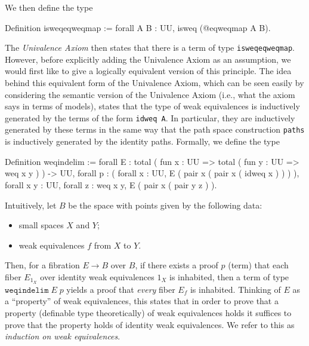 We then define the type 
\begin{center}
  \begin{coqcode}
Definition isweqeqweqmap := forall A B : UU, isweq (@eqweqmap A B).
  \end{coqcode}
\end{center}
The \emph{Univalence Axiom} then states that there is a term of type
\verb|isweqeqweqmap|.  However, before explicitly adding the
Univalence Axiom as an assumption, we would first like to give a
logically equivalent version of this principle.  The idea behind
this equivalent form of the Univalence Axiom, which can be seen easily
by considering the semantic version of the Univalence Axiom (i.e.,
what the axiom says in terms of models), states that the type of weak
equivalences is inductively generated by the terms of the form
\verb|idweq A|.
In particular, they are inductively generated by these terms in the
same way that the path space construction \verb|paths| is
inductively generated by the identity paths.  Formally, we define the
type
\begin{center}
  \begin{coqcode}
Definition weqindelim := 
forall E : 
total ( fun x : UU => total ( fun y : UU => weq x y ) ) -> UU,
forall p : ( forall x : UU, E ( pair x ( pair x ( idweq x ) ) ) ), 
forall x y : UU, forall z : weq x y, E ( pair x ( pair y z ) ).
  \end{coqcode}
\end{center}
Intuitively, let $B$ be the space with points given by the following
data:
\begin{itemize}
\item small spaces $X$ and $Y$;
\item weak equivalences $f$ from $X$ to $Y$.
\end{itemize}
Then, for a fibration $E\to B$ over $B$, if there exists a proof $p$ (term)
that each fiber $E_{1_{X}}$ over identity weak equivalences $1_{X}$ is
inhabited, then a term of type $\texttt{weqindelim}\;E\;p$ yields a proof
that \emph{every} fiber $E_{f}$ is inhabited.  Thinking of $E$ as a
``property'' of weak equivalences, this states that in order to prove
that a property (definable type theoretically) of weak equivalences holds it
suffices to prove that the property holds of identity weak
equivalences.  We refer to this as \emph{induction on weak equivalences}.

